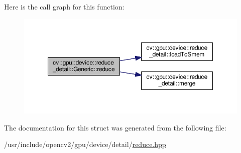 Here is the call graph for this function\-:\nopagebreak
\begin{figure}[H]
\begin{center}
\leavevmode
\includegraphics[width=350pt]{structcv_1_1gpu_1_1device_1_1reduce__detail_1_1Generic_afa48757cbb315acb4744d021985af749_cgraph}
\end{center}
\end{figure}




The documentation for this struct was generated from the following file\-:\begin{DoxyCompactItemize}
\item 
/usr/include/opencv2/gpu/device/detail/\hyperlink{detail_2reduce_8hpp}{reduce.\-hpp}\end{DoxyCompactItemize}
